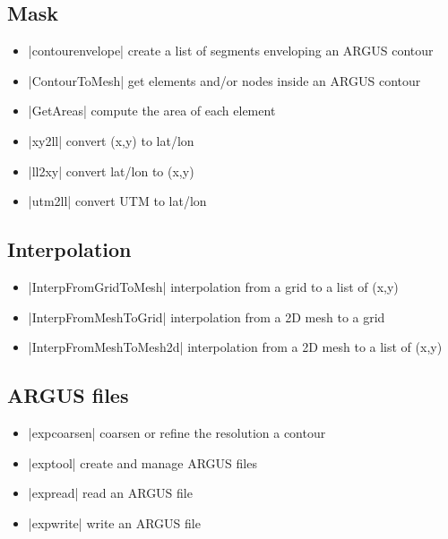 \subsection{Mask}
\begin{itemize}
\item \lstinlinebg|contourenvelope| create a list of segments enveloping an ARGUS contour
\item \lstinlinebg|ContourToMesh| get elements and/or nodes inside an ARGUS contour
\item \lstinlinebg|GetAreas| compute the area of each element
\item \lstinlinebg|xy2ll| convert (x,y) to lat/lon
\item \lstinlinebg|ll2xy| convert lat/lon to (x,y)
\item \lstinlinebg|utm2ll| convert UTM to lat/lon
\end{itemize}

\subsection{Interpolation}
\begin{itemize}
\item \lstinlinebg|InterpFromGridToMesh| interpolation from a grid to a list of (x,y)
\item \lstinlinebg|InterpFromMeshToGrid| interpolation from a 2D mesh to a grid
\item \lstinlinebg|InterpFromMeshToMesh2d| interpolation from a 2D mesh to a list of (x,y)
\end{itemize}

\subsection{ARGUS files}
\begin{itemize}
\item \lstinlinebg|expcoarsen| coarsen or refine the resolution a contour
\item \lstinlinebg|exptool| create and manage ARGUS files
\item \lstinlinebg|expread| read an ARGUS file
\item \lstinlinebg|expwrite| write an ARGUS file
\end{itemize}

